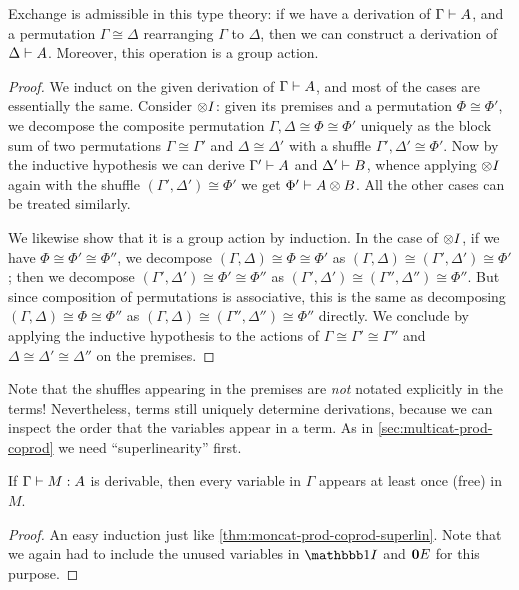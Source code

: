 \begin{lem}\label{thm:smc-exchadm}
  Exchange is admissible in this type theory: if we have a derivation of $\Gamma\vdash A$, and a permutation $\Gamma\cong \Delta$ rearranging $\Gamma$ to $\Delta$, then we can construct a derivation of $\Delta\vdash A$.
  Moreover, this operation is a group action.
\end{lem}
\begin{proof}
  We induct on the given derivation of $\Gamma\vdash A$, and most of the cases are essentially the same.
  Consider $\mathord{\otimes}I$: given its premises and a permutation $\Phi\cong\Phi'$, we decompose the composite permutation $\Gamma,\Delta\cong \Phi\cong\Phi'$ uniquely as the block sum of two permutations $\Gamma\cong \Gamma'$ and $\Delta\cong\Delta'$ with a shuffle $\Gamma',\Delta' \cong \Phi'$.
  Now by the inductive hypothesis we can derive $\Gamma'\vdash A$ and $\Delta'\vdash B$, whence applying $\mathord{\otimes}I$ again with the shuffle $(\Gamma',\Delta') \cong \Phi'$ we get $\Phi' \vdash A\otimes B$.
  All the other cases can be treated similarly.

  We likewise show that it is a group action by induction.
  In the case of $\mathord{\otimes}I$, if we have $\Phi\cong \Phi'\cong\Phi''$, we decompose $(\Gamma,\Delta)\cong \Phi\cong \Phi'$ as $(\Gamma,\Delta)\cong (\Gamma',\Delta')\cong\Phi'$; then we decompose $(\Gamma',\Delta')\cong\Phi' \cong \Phi''$ as $(\Gamma',\Delta')\cong (\Gamma'',\Delta'')\cong\Phi''$.
  But since composition of permutations is associative, this is the same as decomposing $(\Gamma,\Delta)\cong \Phi\cong \Phi''$ as $(\Gamma,\Delta)\cong (\Gamma'',\Delta'')\cong \Phi''$ directly.
  We conclude by applying the inductive hypothesis to the actions of $\Gamma\cong \Gamma'\cong \Gamma''$ and $\Delta\cong \Delta'\cong\Delta''$ on the premises.
\end{proof}

Note that the shuffles appearing in the premises are \emph{not} notated explicitly in the terms!
Nevertheless, terms still uniquely determine derivations, because we can inspect the order that the variables appear in a term.
As in \cref{sec:multicat-prod-coprod} we need ``superlinearity'' first.

\begin{lem}\label{thm:smc-superlin}
  If $\Gamma\vdash M:A$ is derivable, then every variable in $\Gamma$ appears at least once (free) in $M$.
\end{lem}
\begin{proof}
  An easy induction just like \cref{thm:moncat-prod-coprod-superlin}.
  Note that we again had to include the unused variables in $\unit I$ and $\mathbf{0} E$ for this purpose.
\end{proof}

